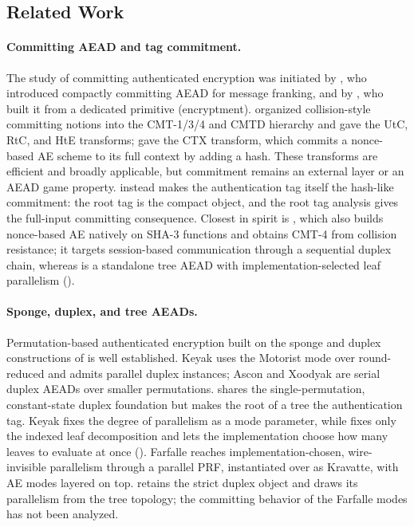 \subsection{Related Work}
\label{sec:related}

\paragraph{Committing AEAD and tag commitment.}
The study of committing authenticated encryption was initiated by \cite{GLR17},
who introduced compactly committing AEAD for message franking, and by
\cite{DGRW18}, who built it from a dedicated primitive (encryptment).
\cite{BH22} organized collision-style committing notions into the
\textsf{CMT-1}/\textsf{3}/\textsf{4} and \textsf{CMTD} hierarchy and gave the
\textsf{UtC}, \textsf{RtC}, and \textsf{HtE} transforms; \cite{CR22} gave the
\textsf{CTX} transform, which commits a nonce-based AE scheme to its full
context by adding a hash. These transforms are efficient and broadly
applicable, but commitment remains an external layer or an AEAD game property.
\TW{} instead makes the authentication tag itself the hash-like commitment:
the root tag is the compact object, and the root tag analysis gives the
\cite{BH22} full-input committing consequence. Closest in spirit is
\cite{DHMVV24}, which also builds nonce-based AE natively on SHA-3 functions and
obtains \textsf{CMT-4} from collision resistance; it targets session-based
communication through a sequential duplex chain, whereas \TW{} is a standalone
tree AEAD with implementation-selected leaf parallelism
().

\paragraph{Sponge, duplex, and tree AEADs.}
Permutation-based authenticated encryption built on the sponge and duplex
constructions of \cite{BDPV08, BDPV11} is well established. Keyak
\cite{BDPVV16} uses the Motorist mode over round-reduced \Keccak{} and admits
parallel duplex instances; Ascon \cite{DEMS21} and Xoodyak \cite{DHPVV20} are
serial duplex AEADs over smaller permutations. \TW{} shares the
single-permutation, constant-state duplex foundation but makes the root of a
tree the authentication tag. Keyak fixes the degree of parallelism as a mode
parameter, while \TW{} fixes only the indexed leaf decomposition and lets the
implementation choose how many leaves to evaluate at once
(). Farfalle \cite{BDHPVV17} reaches
implementation-chosen, wire-invisible parallelism through a parallel PRF,
instantiated over \Keccak{} as Kravatte, with AE modes layered on top. \TW{}
retains the strict \cite{BDPV11} duplex object and draws its parallelism from
the tree topology; the committing behavior of the Farfalle modes has not been
analyzed.

